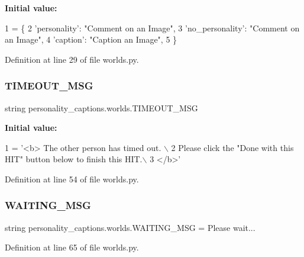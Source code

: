 {\bfseries Initial value\+:}
\begin{DoxyCode}
1 =  \{
2     \textcolor{stringliteral}{'personality'}: \textcolor{stringliteral}{"Comment on an Image"},
3     \textcolor{stringliteral}{'no\_personality'}: \textcolor{stringliteral}{"Comment on an Image"},
4     \textcolor{stringliteral}{'caption'}: \textcolor{stringliteral}{"Caption an Image"},
5 \}
\end{DoxyCode}


Definition at line 29 of file worlds.\+py.

\mbox{\label{namespacepersonality__captions_1_1worlds_a50dcd4a955597ad028296fdaa78c9217}} 
\subsubsection{\texorpdfstring{T\+I\+M\+E\+O\+U\+T\+\_\+\+M\+SG}{TIMEOUT\_MSG}}
{\footnotesize\ttfamily string personality\+\_\+captions.\+worlds.\+T\+I\+M\+E\+O\+U\+T\+\_\+\+M\+SG}

{\bfseries Initial value\+:}
\begin{DoxyCode}
1 =  \textcolor{stringliteral}{'<b> The other person has timed out. \(\backslash\)}
2 \textcolor{stringliteral}{        Please click the "Done with this HIT" button below to finish this HIT.\(\backslash\)}
3 \textcolor{stringliteral}{        </b>'}
\end{DoxyCode}


Definition at line 54 of file worlds.\+py.

\mbox{\label{namespacepersonality__captions_1_1worlds_a94a4e951873f385b27b9d372e295774f}} 
\subsubsection{\texorpdfstring{W\+A\+I\+T\+I\+N\+G\+\_\+\+M\+SG}{WAITING\_MSG}}
{\footnotesize\ttfamily string personality\+\_\+captions.\+worlds.\+W\+A\+I\+T\+I\+N\+G\+\_\+\+M\+SG = \textquotesingle{}Please wait...\textquotesingle{}}



Definition at line 65 of file worlds.\+py.

